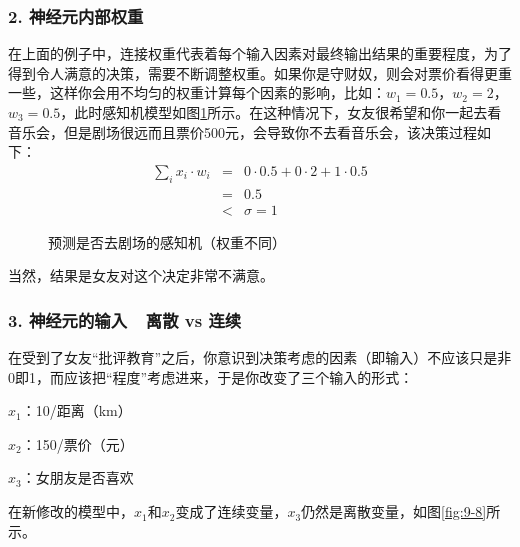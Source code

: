 \vspace{-1em}
\subsubsection{2. 神经元内部权重}

\parinterval 在上面的例子中，连接权重代表着每个输入因素对最终输出结果的重要程度，为了得到令人满意的决策，需要不断调整权重。如果你是守财奴，则会对票价看得更重一些，这样你会用不均匀的权重计算每个因素的影响，比如：$ w_1=0.5 $，$ w_2=2 $，$ w_3=0.5 $，此时感知机模型如图\ref{fig:9-7}所示。在这种情况下，女友很希望和你一起去看音乐会，但是剧场很远而且票价500元，会导致你不去看音乐会，该决策过程如下：
\begin{eqnarray}
\sum_{i}{x_i\cdot w_i} & = & 0\cdot 0.5+0\cdot 2+1\cdot 0.5 \nonumber \\
                                   & = & 0.5 \nonumber \\
                                   & < & \sigma = 1
\label{eq:9-21}
\end{eqnarray}

\begin{figure}[htp]
\centering

\caption{预测是否去剧场的感知机（权重不同）}
\label{fig:9-7}
\end{figure}

\parinterval 当然，结果是女友对这个决定非常不满意。


\subsubsection{3. 神经元的输入\ \dash \ 离散 vs 连续}

\parinterval 在受到了女友“批评教育”之后，你意识到决策考虑的因素（即输入）不应该只是非0即1，而应该把“程度”考虑进来，于是你改变了三个输入的形式：

\parinterval $ x_1 $：10/距离（km）

\parinterval $ x_2 $：150/票价（元）

\parinterval $ x_3 $：女朋友是否喜欢

\parinterval 在新修改的模型中，$ x_1 $和$ x_2 $变成了连续变量，$ x_3 $仍然是离散变量，如图\ref{fig:9-8}所示。

